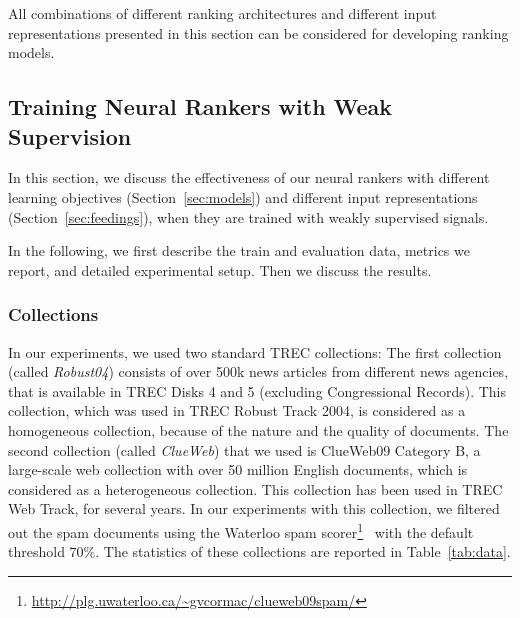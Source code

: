 \medskip
All combinations of different ranking architectures and different input representations presented in this section can be considered for developing ranking models.

\subsection{Training Neural Rankers with Weak Supervision}
In this section,  we discuss the effectiveness of our neural rankers with different learning objectives (Section~\ref{sec:models}) and different input representations (Section~\ref{sec:feedings}), when they are trained with weakly supervised signals.

In the following, we first describe the train and evaluation data, metrics we report, and detailed experimental setup. Then we discuss the results.


\subsubsection{Collections}
\label{sec:collections}
In our experiments, we used two standard TREC collections: The first collection (called \emph{Robust04}) consists of over 500k news articles from different news agencies, that is available in TREC Disks 4 and 5 (excluding Congressional Records). This collection, which was used in TREC Robust Track 2004, is considered as a homogeneous collection, because of the nature and the quality of documents. The second collection (called \emph{ClueWeb}) that we used is ClueWeb09 Category B, a large-scale web collection with over 50 million English documents, which is considered as a heterogeneous collection. This collection has been used in TREC Web Track, for several years. In our experiments with this collection, we filtered out the spam documents using the Waterloo spam scorer\footnote{\url{http://plg.uwaterloo.ca/~gvcormac/clueweb09spam/}}~\citep{Cormack:2011} with the default threshold $70\%$. The statistics of these collections are reported in Table~\ref{tab:data}. 

